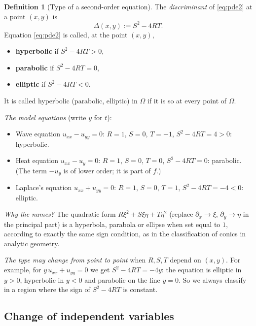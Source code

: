 \documentclass[11pt]{article}
\theoremstyle{plain}
\theoremstyle{definition}
\newtheorem{definition}[theorem]{Definition}
\theoremstyle{remark}
\begin{document}
\begin{definition}[Type of a second-order equation]\label{def:type}
The \emph{discriminant} of \eqref{eq:pde2} at a point $(x,y)$ is
$$ \Delta(x,y) := S^2 - 4RT. $$
Equation \eqref{eq:pde2} is called, at the point $(x,y)$,
\begin{itemize}
    \item \textbf{hyperbolic} if $S^2 - 4RT > 0$,
    \item \textbf{parabolic} if $S^2 - 4RT = 0$,
    \item \textbf{elliptic} if $S^2 - 4RT < 0$.
\end{itemize}
It is called hyperbolic (parabolic, elliptic) in $\Omega$ if it is so at every point of $\Omega$.
\end{definition}

\emph{The model equations} (write $y$ for $t$):
\begin{itemize}
    \item Wave equation $u_{xx} - u_{yy} = 0$: $R = 1$, $S = 0$, $T = -1$, $S^2 - 4RT = 4 > 0$: hyperbolic.
    \item Heat equation $u_{xx} - u_y = 0$: $R = 1$, $S = 0$, $T = 0$, $S^2 - 4RT = 0$: parabolic. (The term $-u_y$ is of lower order; it is part of $f$.)
    \item Laplace's equation $u_{xx} + u_{yy} = 0$: $R = 1$, $S = 0$, $T = 1$, $S^2 - 4RT = -4 < 0$: elliptic.
\end{itemize}

\emph{Why the names?} The quadratic form $R\xi^2 + S\xi\eta + T\eta^2$ (replace $\partial_x \to \xi$, $\partial_y \to \eta$ in the principal part) is a hyperbola, parabola or ellipse when set equal to $1$, according to exactly the same sign condition, as in the classification of conics in analytic geometry.

\emph{The type may change from point to point} when $R, S, T$ depend on $(x,y)$. For example, for $y\,u_{xx} + u_{yy} = 0$ we get $S^2 - 4RT = -4y$: the equation is elliptic in $y > 0$, hyperbolic in $y < 0$ and parabolic on the line $y = 0$. So we always classify in a region where the sign of $S^2 - 4RT$ is constant.

\subsection{Change of independent variables}\label{ssec:changevar}
\end{document}
